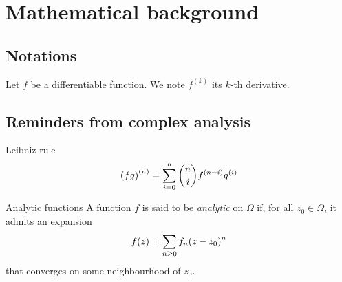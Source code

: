 \documentclass[../main.tex]{subfiles}
\begin{document}
\chapter{Mathematical background}

\section{Notations}

\begin{definition}{}
	Let $f$ be a differentiable function. We note $f^{(k)}$ its $k$-th derivative.
\end{definition}

%		
%		

\section{Reminders from complex analysis}


\begin{thm}{Leibniz rule}\label{Leibniz_rule}
	\[
	{(fg)}^{(n)} = \sum\limits_{i=0}^{n} {n \choose i} f^{(n - i)} g^{(i)}
	\]
\end{thm}

\begin{definition}{Analytic functions}
	A function $f$ is said to be \emph{analytic} on $\Omega$ if, for all $z_0 \in \Omega$, it admits an expansion
	\[
	f(z) = \sum\limits_{n \geq 0} f_n {(z - z_0)}^n
	\]
	that converges on some neighbourhood of $z_0$.
\end{definition}
\end{document}
